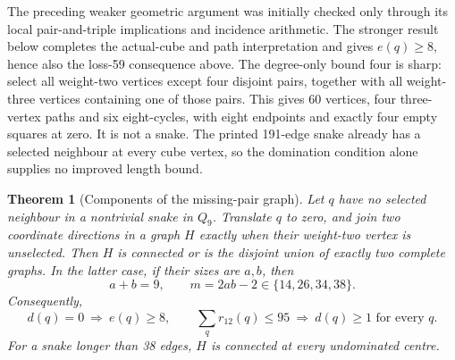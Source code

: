 \documentclass[11pt,a4paper]{article}
\newtheorem{theorem}{Theorem}[section]
\theoremstyle{definition}
\theoremstyle{remark}
\newcommand{\Q}{Q}
\begin{document}
The preceding weaker geometric argument was initially checked only through
its local pair-and-triple implications and incidence arithmetic. The stronger
result below completes the actual-cube and path interpretation and gives
$e(q)\ge8$, hence also the loss-59 consequence above. The degree-only
bound four is sharp:
select all weight-two vertices except four disjoint pairs, together with
all weight-three vertices containing one of those pairs. This gives
60 vertices, four three-vertex paths and six eight-cycles, with eight
endpoints and exactly four empty squares at zero. It is not a snake.
The printed 191-edge snake already has a selected neighbour at every
cube vertex, so the domination condition alone supplies no improved
length bound.

\begin{theorem}[Components of the missing-pair graph]
\label{thm:missing-pair-components}
Let $q$ have no selected neighbour in a nontrivial snake in $\Q_9$.
Translate $q$ to zero, and join two coordinate directions in a graph $H$
exactly when their weight-two vertex is unselected. Then $H$ is connected
or is the disjoint union of exactly two complete graphs.
In the latter case, if their sizes are $a,b$, then
\[
a+b=9,\qquad m=2ab-2\in\{14,26,34,38\}.
\]
Consequently,
\[
\boxed{d(q)=0\ \Longrightarrow\ e(q)\ge8,}
\qquad
\boxed{\sum_q r_{12}(q)\le95\ \Longrightarrow\ d(q)\ge1\text{ for every }q.}
\]
For a snake longer than 38 edges, $H$ is connected at every undominated centre.
\end{theorem}
\end{document}
